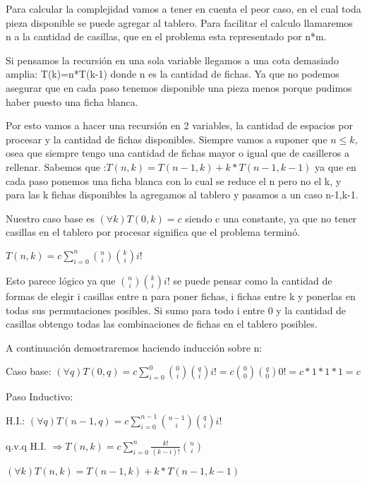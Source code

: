 Para calcular la complejidad vamos a tener en cuenta el peor caso, en el cual toda pieza disponible se puede agregar al tablero. Para facilitar el calculo llamaremos n a la cantidad de casillas, que en el problema esta representado por n*m.

Si pensamos la recursión en una sola variable llegamos a una cota demasiado amplia:
T(k)=n*T(k-1) donde n es la cantidad de fichas. Ya que no podemos asegurar que en cada paso tenemos disponible una pieza menos porque pudimos haber puesto una ficha blanca.

Por esto vamos a hacer una recursión en 2 variables, la cantidad de espacios por procesar y la cantidad de fichas disponibles. Siempre vamos a suponer que $n\leq k$, osea que siempre tengo una cantidad de fichas mayor o igual que de casilleros a rellenar.
Sabemos que :$T(n,k) = T(n-1,k) + k*T(n-1,k-1)$ ya que en cada paso ponemos una ficha blanca con lo cual se reduce el n pero no el k, y para las k fichas disponibles la agregamos al tablero y pasamos a un caso n-1,k-1.

Nuestro caso base es $(\forall k) T(0,k)= c$ siendo c una constante, ya que no tener casillas en el tablero por procesar significa que el problema terminó.


$T(n,k) = c \sum_{i=0}^{n} \binom{n}{i} \binom{k}{i} i!$

Esto parece lógico ya que $\binom{n}{i} \binom{k}{i} i!$ se puede pensar como la cantidad de formas de elegir i casillas entre n para poner fichas, i fichas entre k y ponerlas en todas sus permutaciones posibles. Si sumo para todo i entre 0 y la cantidad de casillas obtengo todas las combinaciones de fichas en el tablero posibles.

A continuación demostraremos haciendo inducción sobre n:

Caso base: $(\forall q)T(0,q)= c \sum_{i=0}^{0} \binom{0}{i} \binom{q}{i} i! = c \binom{0}{0} \binom{q}{0} 0! = c*1*1*1 = c$

Paso Inductivo:

H.I.: $(\forall q)T(n-1,q) = c \sum_{i=0}^{n-1} \binom{n-1}{i} \binom{q}{i} i!$

q.v.q H.I. $\Rightarrow T(n,k)  = c  \sum_{i=0}^{n} \frac{k!}{(k-i)!}\binom{n}{i}$ 

$(\forall k) T(n,k) = T(n-1,k) + k*T(n-1,k-1)$

